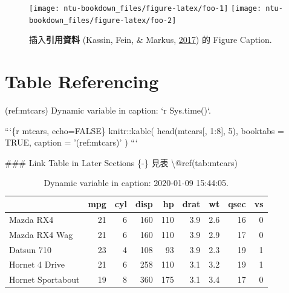 \documentclass[oneside]{book}
\newenvironment{Shaded}{\begin{snugshade}}{\end{snugshade}}
\newcommand{\BaseNTok}[1]{\textcolor[rgb]{0.00,0.00,0.81}{#1}}
\newcommand{\FunctionTok}[1]{\textcolor[rgb]{0.00,0.00,0.00}{#1}}
\newcommand{\NormalTok}[1]{#1}
\theoremstyle{definition}
\theoremstyle{definition}
\theoremstyle{definition}
\theoremstyle{remark}
\begin{document}
\begin{figure}

{\centering \texttt{[image: ntu-bookdown\_files/figure-latex/foo-1]} \texttt{[image: ntu-bookdown\_files/figure-latex/foo-2]} 

}

\caption{插入\textbf{引用資料} (Kassin, Fein, \& Markus, \protect\hyperlink{ref-kassin2017}{2017}) 的 Figure Caption.}\label{fig:foo}
\end{figure}

\hypertarget{table-referencing}{%
\section{Table Referencing}\label{table-referencing}}

\begin{Shaded}
\begin{Highlighting}[]
\NormalTok{(ref:mtcars) Dynamic variable in caption: }\BaseNTok{`r Sys.time()`}\NormalTok{.}

\BaseNTok{```\{r mtcars, echo=FALSE\}}
\BaseNTok{knitr::kable(}
\BaseNTok{  head(mtcars[, 1:8], 5), booktabs = TRUE,}
\BaseNTok{  caption = '(ref:mtcars)'}
\BaseNTok{  )}
\BaseNTok{```}

\FunctionTok{### Link Table in Later Sections \{-\}}
\NormalTok{見表 \textbackslash{}@ref(tab:mtcars)}
\end{Highlighting}
\end{Shaded}



\begin{table}

\caption{\label{tab:mtcar}Dynamic variable in caption: 2020-01-09 15:44:05.}
\centering
\begin{tabular}[t]{lrrrrrrrr}
\toprule
  & mpg & cyl & disp & hp & drat & wt & qsec & vs\\
\midrule
Mazda RX4 & 21 & 6 & 160 & 110 & 3.9 & 2.6 & 16 & 0\\
Mazda RX4 Wag & 21 & 6 & 160 & 110 & 3.9 & 2.9 & 17 & 0\\
Datsun 710 & 23 & 4 & 108 & 93 & 3.9 & 2.3 & 19 & 1\\
Hornet 4 Drive & 21 & 6 & 258 & 110 & 3.1 & 3.2 & 19 & 1\\
Hornet Sportabout & 19 & 8 & 360 & 175 & 3.1 & 3.4 & 17 & 0\\
\bottomrule
\end{tabular}
\end{table}
\end{document}
